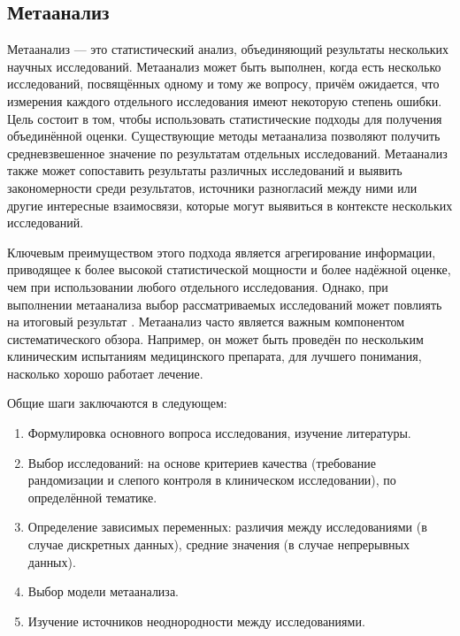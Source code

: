 \subsection{Метаанализ}\label{subsec:ch1/sec2/subsec4}

Метаанализ --- это статистический анализ, объединяющий результаты нескольких научных исследований. Метаанализ может быть выполнен, когда есть несколько исследований, посвящённых одному и тому же вопросу, причём ожидается, что измерения каждого отдельного исследования имеют некоторую степень ошибки. Цель состоит в том, чтобы использовать статистические подходы для получения объединённой оценки. Существующие методы метаанализа позволяют получить средневзвешенное значение по результатам отдельных исследований. Метаанализ также может сопоставить результаты различных исследований и выявить закономерности среди результатов, источники разногласий между ними или другие интересные взаимосвязи, которые могут выявиться в контексте нескольких исследований.

Ключевым преимуществом этого подхода является агрегирование информации, приводящее к более высокой статистической мощности и более надёжной оценке, чем при использовании любого отдельного исследования. Однако, при выполнении метаанализа выбор рассматриваемых исследований может повлиять на итоговый результат \autocite{WALKER2008}. Метаанализ часто является важным компонентом  систематического обзора. Например, он может быть проведён по нескольким клиническим испытаниям медицинского препарата, для лучшего понимания, насколько хорошо работает лечение. 

Общие шаги заключаются в следующем:
\begin{enumerate}
	\item Формулировка основного вопроса исследования, изучение литературы.
	\item Выбор исследований: на основе критериев качества (требование рандомизации и слепого контроля в клиническом исследовании), по определённой тематике.
	\item Определение зависимых переменных: различия между исследованиями (в случае дискретных данных), средние значения (в случае непрерывных данных).
	\item Выбор модели метаанализа.
	\item Изучение источников неоднородности между исследованиями.
\end{enumerate}

